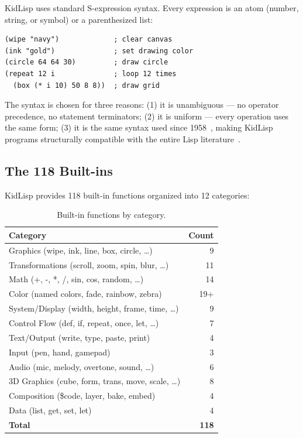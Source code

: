 \documentclass[sigconf,nonacm]{acmart}
\begin{document}
KidLisp uses standard S-expression syntax. Every expression is an atom (number, string, or symbol) or a parenthesized list:

\begin{lstlisting}
(wipe "navy")             ; clear canvas
(ink "gold")              ; set drawing color
(circle 64 64 30)         ; draw circle
(repeat 12 i              ; loop 12 times
  (box (* i 10) 50 8 8))  ; draw grid
\end{lstlisting}

The syntax is chosen for three reasons: (1) it is unambiguous --- no operator precedence, no statement terminators; (2) it is uniform --- every operation uses the same form; (3) it is the same syntax used since 1958~\cite{mccarthy1960recursive}, making KidLisp programs structurally compatible with the entire Lisp literature~\cite{abelson1996sicp, friedman1996little}.

\subsection{The 118 Built-ins}

KidLisp provides 118 built-in functions organized into 12 categories:

\begin{table}[h]
\small
\centering
\begin{tabular}{lr}
\toprule
\textbf{Category} & \textbf{Count} \\
\midrule
Graphics (wipe, ink, line, box, circle, \ldots) & 9 \\
Transformations (scroll, zoom, spin, blur, \ldots) & 11 \\
Math (+, -, *, /, sin, cos, random, \ldots) & 14 \\
Color (named colors, fade, rainbow, zebra) & 19+ \\
System/Display (width, height, frame, time, \ldots) & 9 \\
Control Flow (def, if, repeat, once, let, \ldots) & 7 \\
Text/Output (write, type, paste, print) & 4 \\
Input (pen, hand, gamepad) & 3 \\
Audio (mic, melody, overtone, sound, \ldots) & 6 \\
3D Graphics (cube, form, trans, move, scale, \ldots) & 8 \\
Composition (\$code, layer, bake, embed) & 4 \\
Data (list, get, set, let) & 4 \\
\midrule
\textbf{Total} & \textbf{118} \\
\bottomrule
\end{tabular}
\caption{Built-in functions by category.}
\label{tab:builtins}
\end{table}
\end{document}

